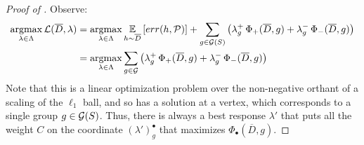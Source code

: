 \dualbr*

\begin{proof}[Proof of ]
Observe:
\begin{align*}
  \operatorname*{\mathrm{argmax}}_{\lambda\in \Lambda} \mathcal{L}(\overline D, \lambda) &=
                                                           \operatorname*{\mathrm{argmax}}_{\lambda\in \Lambda} \operatorname*{\mathbb{E}}_{h\sim \overline
                                                           D}\left[err(h, \mathcal{P})\right] + \sum_{g\in \mathcal{G}(S)} \left( \lambda_g^+\,  \Phi_+(\overline D, g) +  \lambda_g^- \,  \Phi_-(\overline D,g)\right)\\
                                                         &=   \operatorname*{\mathrm{argmax}}_{\lambda\in \Lambda}  \sum_{g\in \mathcal{G}} \left( \lambda_g^+\,  \Phi_+(\overline D, g) +  \lambda_g^- \,  \Phi_-(\overline D,g)\right)
\end{align*}
Note that this is a linear optimization problem over the non-negative
orthant of a scaling of the $\ell_1$ ball, and so has a solution at a
vertex, which corresponds to a single group $g \in \mathcal{G}(S)$. Thus,
there is always a best response $\lambda'$ that puts all the weight
$C$ on the coordinate $(\lambda')_g^\bullet$ that maximizes
$\Phi_\bullet(\overline D, g)$.
\end{proof}

